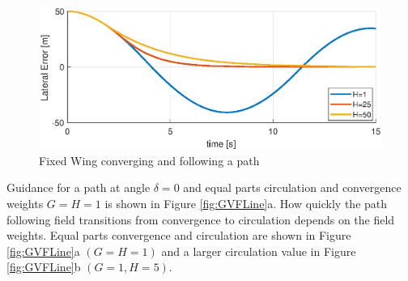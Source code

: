 \documentclass[numbered,pdftex]{ohio-etd}
\begin{document}
\begin{figure}[H]
	\centering
	\includegraphics[trim=0 0 0 0,clip,width=16cm]{PaperFigures/Methods/lateralErrorVsTime}
	\caption{Fixed Wing converging and following a path}
	\label{fig:uavPathMultipleHsLateral}
\end{figure}


Guidance for a path at angle $\delta = 0$ and equal parts circulation and convergence weights $G=H=1$ is shown in Figure \ref{fig:GVFLine}a. How quickly the path following field transitions from convergence to circulation depends on the field weights. Equal parts convergence and circulation are shown in Figure \ref{fig:GVFLine}a $(G=H=1)$ and a larger circulation value in Figure \ref{fig:GVFLine}b $(G=1, H=5)$. \\
\end{document}
